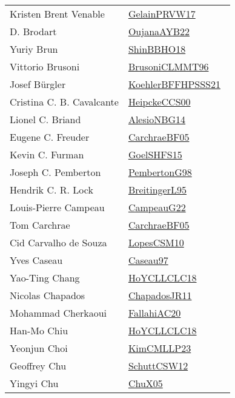 {\begin{longtable}{p{4cm}p{20cm}}
Kristen Brent Venable & \href{papers/GelainPRVW17.pdf}{GelainPRVW17}~\cite{GelainPRVW17}\\
D. Brodart & \href{papers/OujanaAYB22.pdf}{OujanaAYB22}~\cite{OujanaAYB22}\\
Yuriy Brun & \href{articles/ShinBBHO18.pdf}{ShinBBHO18}~\cite{ShinBBHO18}\\
Vittorio Brusoni & \href{papers/BrusoniCLMMT96.pdf}{BrusoniCLMMT96}~\cite{BrusoniCLMMT96}\\
Josef B{\"{u}}rgler & \href{articles/KoehlerBFFHPSSS21.pdf}{KoehlerBFFHPSSS21}~\cite{KoehlerBFFHPSSS21}\\
Cristina C. B. Cavalcante & \href{articles/HeipckeCCS00.pdf}{HeipckeCCS00}~\cite{HeipckeCCS00}\\
Lionel C. Briand & \href{papers/AlesioNBG14.pdf}{AlesioNBG14}~\cite{AlesioNBG14}\\
Eugene C. Freuder & \href{papers/CarchraeBF05.pdf}{CarchraeBF05}~\cite{CarchraeBF05}\\
Kevin C. Furman & \href{articles/GoelSHFS15.pdf}{GoelSHFS15}~\cite{GoelSHFS15}\\
Joseph C. Pemberton & \href{papers/PembertonG98.pdf}{PembertonG98}~\cite{PembertonG98}\\
Hendrik C. R. Lock & \href{}{BreitingerL95}~\cite{BreitingerL95}\\
Louis{-}Pierre Campeau & \href{articles/CampeauG22.pdf}{CampeauG22}~\cite{CampeauG22}\\
Tom Carchrae & \href{papers/CarchraeBF05.pdf}{CarchraeBF05}~\cite{CarchraeBF05}\\
Cid Carvalho de Souza & \href{articles/LopesCSM10.pdf}{LopesCSM10}~\cite{LopesCSM10}\\
Yves Caseau & \href{papers/Caseau97.pdf}{Caseau97}~\cite{Caseau97}\\
Yao{-}Ting Chang & \href{papers/HoYCLLCLC18.pdf}{HoYCLLCLC18}~\cite{HoYCLLCLC18}\\
Nicolas Chapados & \href{papers/ChapadosJR11.pdf}{ChapadosJR11}~\cite{ChapadosJR11}\\
Mohammad Cherkaoui & \href{}{FallahiAC20}~\cite{FallahiAC20}\\
Han{-}Mo Chiu & \href{papers/HoYCLLCLC18.pdf}{HoYCLLCLC18}~\cite{HoYCLLCLC18}\\
Yeonjun Choi & \href{papers/KimCMLLP23.pdf}{KimCMLLP23}~\cite{KimCMLLP23}\\
Geoffrey Chu & \href{papers/SchuttCSW12.pdf}{SchuttCSW12}~\cite{SchuttCSW12}\\
Yingyi Chu & \href{papers/ChuX05.pdf}{ChuX05}~\cite{ChuX05}\\

\end{longtable}}
